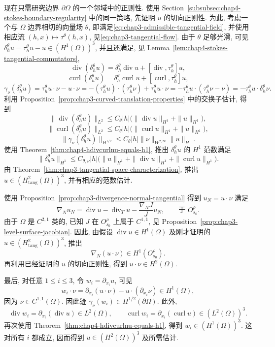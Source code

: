 \begin{Proof}
现在只需研究边界 $\partial\Omega$ 的一个邻域中的正则性. 使用 Section~\ref{subsubsec:chap4-stokes-boundary-regularity} 中的同一策略, 先证明 $u$ 的切向正则性. 为此, 考虑一个与 $\Omega$ 边界相切的向量场 $\theta$, 即满足\eqref{eq:chap3-admissible-tangential-field}, 并使用相应流 $(h,x)\mapsto\tau^\theta(h,x)$, 见\eqref{eq:chap3-tangential-flow}. 由于 $\theta$ 足够光滑, 可见 $\delta_h^\theta u=\tau_h^\theta u-u\in(H^1(\Omega))^3$, 并且还满足, 见 Lemma~\ref{lem:chap4-stokes-tangential-commutators},
\[
 \operatorname{div}(\delta_h^\theta u)
 =\delta_h^\theta\operatorname{div}u+[\operatorname{div},\tau_h^\theta]u,
\]
\[
 \operatorname{curl}(\delta_h^\theta u)
 =\delta_h^\theta\operatorname{curl}u+[\operatorname{curl},\tau_h^\theta]u,
\]
\[
 \gamma_\nu(\delta_h^\theta u)
 =\tau_h^\theta u\cdot\nu-u\cdot\nu
 =-(\tau_h^\theta u)\cdot(\tau_h^\theta\nu)+\tau_h^\theta u\cdot\nu
 =-\tau_h^\theta u\cdot(\tau_h^\theta\nu-\nu)
 =-\tau_h^\theta u\cdot\delta_h^\theta\nu.
\]
利用 Proposition~\ref{prop:chap3-curved-translation-properties} 中的交换子估计, 得到
\[
 \|\operatorname{div}(\delta_h^\theta u)\|_{L^2}
 \leq C_\theta|h|\bigl(\|\operatorname{div}u\|_{H^1}+\|u\|_{H^1}\bigr),
\]
\[
 \|\operatorname{curl}(\delta_h^\theta u)\|_{L^2}
 \leq C_\theta|h|\bigl(\|\operatorname{curl}u\|_{H^1}+\|u\|_{H^1}\bigr),
\]
\begin{equation}
 \|\gamma_\nu(\delta_h^\theta u)\|_{H^{1/2}}
 \leq C_\theta|h|\|\nu\|_{W^{2,\infty}}\|u\|_{H^1}.
 \label{eq:chap4-divcurl-tangential-trace-estimate}
\end{equation}
使用 Theorem~\ref{thm:chap4-hdivcurlnu-equals-h1}, 推出 $\delta_h^\theta u$ 的 $H^1$ 范数满足
\[
 \|\delta_h^\theta u\|_{H^1}
 \leq C_{\theta,\nu}|h|
 \bigl(\|u\|_{H^1}+\|\operatorname{div}u\|_{H^1}+\|\operatorname{curl}u\|_{H^1}\bigr).
\]
由 Theorem~\ref{thm:chap3-tangential-space-characterization}, 推出 $u\in(H_{\mathrm{tang}}^2(\Omega))^3$, 并有相应的范数估计.

使用 Proposition~\ref{prop:chap3-divergence-normal-tangential} 得到 $u_N=u\cdot\nu$ 满足
\[
 \nabla_Nu_N=\operatorname{div}u-\operatorname{div}_T u-\frac{\nabla_NJ}{J}u_N,
 \qquad\text{于 }O_{s_0}^\rho.
\]
由于 $\Omega$ 是 $C^{2,1}$ 类的, 已知 $J$ 在 $O_{s_0}^\rho$ 上属于 $C^{1,1}$, 见 Proposition~\ref{prop:chap3-level-surface-jacobian}. 因此, 由假设 $\operatorname{div}u\in H^1(\Omega)$ 及刚才证明的 $u\in(H_{\mathrm{tang}}^2(\Omega))^3$, 推出
\[
 \nabla_N(u\cdot\nu)\in H^1(O_{s_0}^\rho).
\]
再利用已经证明的 $u$ 的切向正则性, 得到 $u\cdot\nu\in H^2(\Omega)$.

最后, 对任意 $1\leq i\leq3$, 令 $w_i=\partial_{x_i}u$, 可见
\[
 w_i\cdot\nu=\partial_{x_i}(u\cdot\nu)-u\cdot(\partial_{x_i}\nu)\in H^1(\Omega),
\]
因为 $\nu\in C^{1,1}(\Omega)$. 因此迹 $\gamma_\nu(w_i)\in H^{1/2}(\partial\Omega)$. 此外,
\[
 \operatorname{div}w_i=\partial_{x_i}(\operatorname{div}u)\in L^2(\Omega),
 \qquad
 \operatorname{curl}w_i=\partial_{x_i}(\operatorname{curl}u)\in(L^2(\Omega))^3.
\]
再次使用 Theorem~\ref{thm:chap4-hdivcurlnu-equals-h1}, 得到 $w_i\in(H^1(\Omega))^3$. 这对所有 $i$ 都成立, 因而得到 $u\in(H^2(\Omega))^3$ 及所需估计.
\end{Proof}

